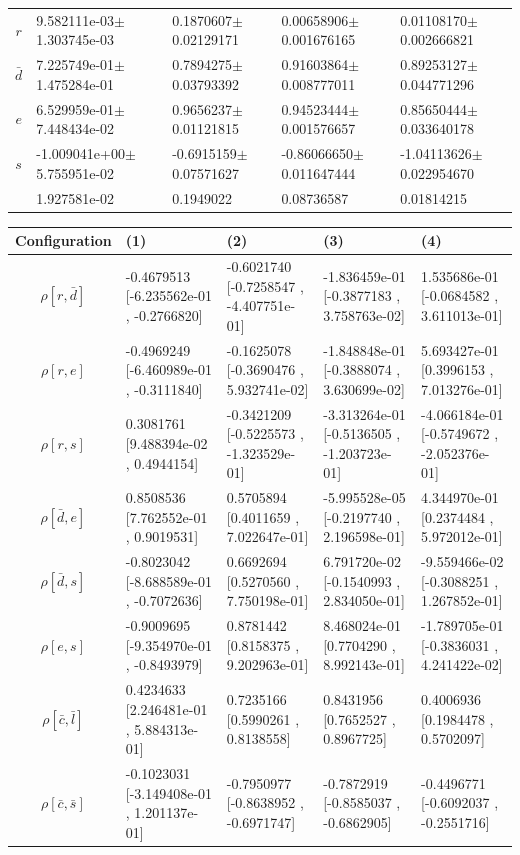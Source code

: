\begin{center}
\begin{tabular}{|c|p{3.7cm}|p{3.7cm}|p{3.7cm}|p{3.7cm}|}
$r$&9.582111e-03$\pm$1.303745e-03&0.1870607$\pm$0.02129171&0.00658906$\pm$0.001676165&0.01108170$\pm$0.002666821\\
$\bar{d}$&7.225749e-01$\pm$1.475284e-01&0.7894275$\pm$0.03793392&0.91603864$\pm$0.008777011&0.89253127$\pm$0.044771296\\
$e$&6.529959e-01$\pm$7.448434e-02&0.9656237$\pm$0.01121815&0.94523444$\pm$0.001576657&0.85650444$\pm$0.033640178\\
$s$&-1.009041e+00$\pm$5.755951e-02&-0.6915159$\pm$0.07571627&-0.86066650$\pm$0.011647444&-1.04113626$\pm$0.022954670\\
&1.927581e-02&0.1949022&0.08736587&0.01814215\\\hline
\end{tabular}


\begin{tabular}{|c|p{3.7cm}|p{3.7cm}|p{3.7cm}|p{3.7cm}|}
\hline
Configuration&(1)&(2)&(3)&(4)\\\hline
$\rho[r,\bar{d}]$&-0.4679513 [-6.235562e-01 , -0.2766820]&-0.6021740 [-0.7258547 , -4.407751e-01]&-1.836459e-01 [-0.3877183 , 3.758763e-02]&1.535686e-01 [-0.0684582 , 3.611013e-01]\\
$\rho[r,e]$&-0.4969249 [-6.460989e-01 , -0.3111840]&-0.1625078 [-0.3690476 , 5.932741e-02]&-1.848848e-01 [-0.3888074 , 3.630699e-02]&5.693427e-01 [0.3996153 , 7.013276e-01]\\
$\rho[r,s]$&0.3081761 [9.488394e-02 , 0.4944154]&-0.3421209 [-0.5225573 , -1.323529e-01]&-3.313264e-01 [-0.5136505 , -1.203723e-01]&-4.066184e-01 [-0.5749672 , -2.052376e-01]\\
$\rho[\bar{d},e]$&0.8508536 [7.762552e-01 , 0.9019531]&0.5705894 [0.4011659 , 7.022647e-01]&-5.995528e-05 [-0.2197740 , 2.196598e-01]&4.344970e-01 [0.2374484 , 5.972012e-01]\\
$\rho[\bar{d},s]$&-0.8023042 [-8.688589e-01 , -0.7072636]&0.6692694 [0.5270560 , 7.750198e-01]&6.791720e-02 [-0.1540993 , 2.834050e-01]&-9.559466e-02 [-0.3088251 , 1.267852e-01]\\
$\rho[e,s]$&-0.9009695 [-9.354970e-01 , -0.8493979]&0.8781442 [0.8158375 , 9.202963e-01]&8.468024e-01 [0.7704290 , 8.992143e-01]&-1.789705e-01 [-0.3836031 , 4.241422e-02]\\\hline
$\rho[\bar{c},\bar{l}]$&0.4234633 [2.246481e-01 , 5.884313e-01]&0.7235166 [0.5990261 , 0.8138558]&0.8431956 [0.7652527 , 0.8967725]&0.4006936 [0.1984478 , 0.5702097]\\
$\rho[\bar{c},\bar{s}]$&-0.1023031 [-3.149408e-01 , 1.201137e-01]&-0.7950977 [-0.8638952 , -0.6971747]&-0.7872919 [-0.8585037 , -0.6862905]&-0.4496771 [-0.6092037 , -0.2551716]\\

\end{tabular}
\end{center}
